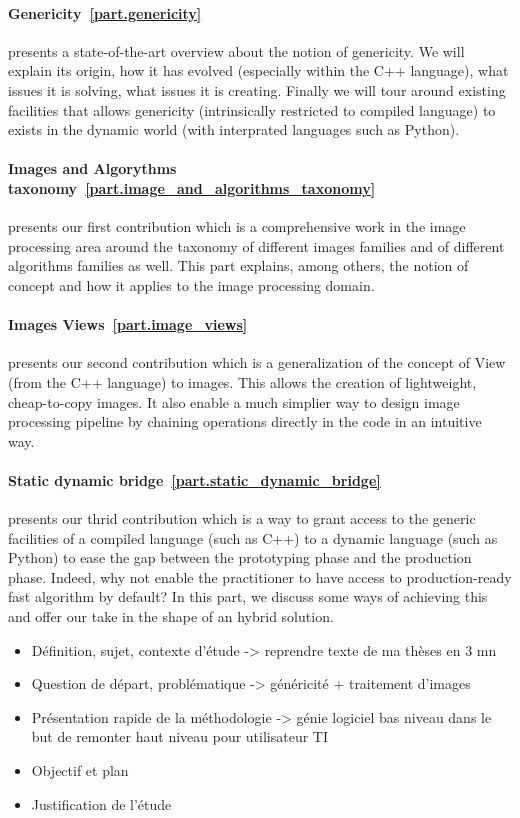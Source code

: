 \paragraph{Genericity~\ref{part.genericity}} presents a state-of-the-art overview about the notion of genericity. We
will explain its origin, how it has evolved (especially within the C++ language), what issues it is solving, what issues
it is creating. Finally we will tour around existing facilities that allows genericity (intrinsically restricted to
compiled language) to exists in the dynamic world (with interprated languages such as Python).

\paragraph{Images and Algorythms taxonomy~\ref{part.image_and_algorithms_taxonomy}} presents our first contribution
which is a comprehensive work in the image processing area around the taxonomy of different images families and of
different algorithms families as well. This part explains, among others, the notion of concept and how it applies to the
image processing domain.

\paragraph{Images Views~\ref{part.image_views}} presents our second contribution which is a generalization of the
concept of View (from the C++ language) to images. This allows the creation of lightweight, cheap-to-copy images. It
also enable a much simplier way to design image processing pipeline by chaining operations directly in the code in an
intuitive way.

\paragraph{Static dynamic bridge~\ref{part.static_dynamic_bridge}} presents our thrid contribution which is a way to
grant access to the generic facilities of a compiled language (such as C++) to a dynamic language (such as Python) to
ease the gap between the prototyping phase and the production phase. Indeed, why not enable the practitioner to have
access to production-ready fast algorithm by default? In this part, we discuss some ways of achieving this and offer our
take in the shape of an hybrid solution.



\begin{itemize}
  \item Définition, sujet, contexte d'étude -> reprendre texte de ma thèses en 3 mn
  \item Question de départ, problématique -> généricité + traitement d'images
  \item Présentation rapide de la méthodologie -> génie logiciel bas niveau dans le but de remonter haut niveau pour utilisateur TI
  \item Objectif et plan
  \item Justification de l'étude
\end{itemize}

